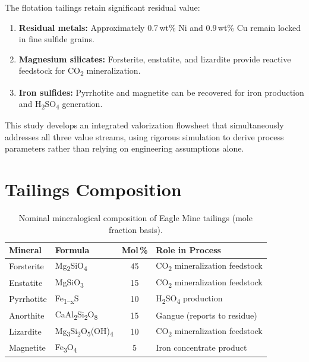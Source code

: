 \documentclass[11pt,a4paper]{article}
\begin{document}
The flotation tailings retain significant residual value:

\begin{enumerate}[label=(\roman*)]
  \item \textbf{Residual metals:} Approximately 0.7\,wt\% Ni and
        0.9\,wt\% Cu remain locked in fine sulfide grains.
  \item \textbf{Magnesium silicates:} Forsterite, enstatite, and
        lizardite provide reactive feedstock for CO\textsubscript{2}
        mineralization.
  \item \textbf{Iron sulfides:} Pyrrhotite and magnetite can be
        recovered for iron production and H\textsubscript{2}SO\textsubscript{4}
        generation.
\end{enumerate}

This study develops an integrated valorization flowsheet that
simultaneously addresses all three value streams, using rigorous
simulation to derive process parameters rather than relying on
engineering assumptions alone.

\section{Tailings Composition}
\label{sec:composition}

\begin{table}[H]
\centering
\caption{Nominal mineralogical composition of Eagle Mine tailings
  (mole fraction basis).}
\label{tab:mineralogy}
\begin{tabular}{@{}llcl@{}}
\toprule
\textbf{Mineral} & \textbf{Formula} & \textbf{Mol\,\%} & \textbf{Role in Process} \\
\midrule
Forsterite   & Mg\textsubscript{2}SiO\textsubscript{4}                    & 45 & CO\textsubscript{2} mineralization feedstock \\
Enstatite    & MgSiO\textsubscript{3}                                      & 15 & CO\textsubscript{2} mineralization feedstock \\
Pyrrhotite   & Fe\textsubscript{1--x}S                                     & 10 & H\textsubscript{2}SO\textsubscript{4} production \\
Anorthite    & CaAl\textsubscript{2}Si\textsubscript{2}O\textsubscript{8}  & 15 & Gangue (reports to residue) \\
Lizardite    & Mg\textsubscript{3}Si\textsubscript{2}O\textsubscript{5}(OH)\textsubscript{4} & 10 & CO\textsubscript{2} mineralization feedstock \\
Magnetite    & Fe\textsubscript{3}O\textsubscript{4}                       &  5 & Iron concentrate product \\
\bottomrule
\end{tabular}
\end{table}
\end{document}
